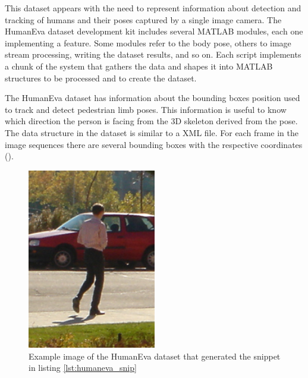 This dataset appears with the need to represent information about detection and tracking of humans and their poses captured by a single image camera. The HumanEva dataset development kit includes several MATLAB modules, each one implementing a feature. Some modules refer to the body pose, others to image stream processing, writing the dataset results, and so on. Each script implements a chunk of the system that gathers the data and shapes it into MATLAB structures to be processed and to create the dataset.

The HumanEva dataset has information about the bounding boxes position used to track and detect pedestrian limb poses. This information is useful to know which direction the person is facing from the 3D skeleton derived from the pose. The data structure in the dataset is similar to a XML file. For each frame in the image sequences there are several bounding boxes with the respective coordinates (\cite{Sigal}).

\begin{figure}

\end{figure}

\begin{figure}[htp]
	
	\centering
	\includegraphics[width=0.5\textwidth]{capstate/imgs/00050.png}
	
	\caption{Example image of the HumanEva dataset that generated the snippet in listing \ref{lst:humaneva_snip} }
	\label{fig:00050}
	
\end{figure}

